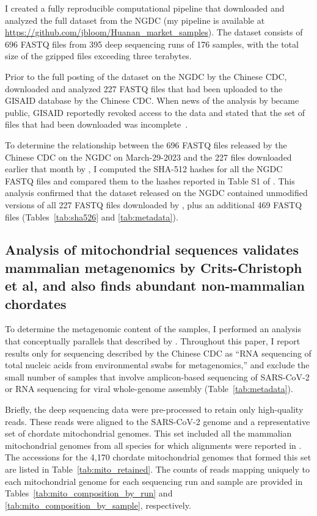 \documentclass[9pt,twocolumn,twoside]{gsajnl_modified}
\begin{document}
I created a fully reproducible computational pipeline that downloaded and analyzed the full dataset from the NGDC (my pipeline is available at \url{https://github.com/jbloom/Huanan_market_samples}).
The dataset consists of 696 FASTQ files from 395 deep sequencing runs of 176 samples, with the total size of the gzipped files exceeding three terabytes.

Prior to the full posting of the dataset on the NGDC by the Chinese CDC, \citet{crits2023genetic} downloaded and analyzed 227 FASTQ files that had been uploaded to the GISAID database by the Chinese CDC.
When news of the analysis by \citet{crits2023genetic} became public, GISAID reportedly revoked access to the data and stated that the set of files that had been downloaded was incomplete~\citep{cohen2023new,gisaid_statement}.

To determine the relationship between the 696 FASTQ files released by the Chinese CDC on the NGDC on March-29-2023 and the 227 files downloaded earlier that month by \citet{crits2023genetic}, I computed the SHA-512 hashes for all the NGDC FASTQ files and compared them to the hashes reported in Table S1 of \citet{crits2023genetic}.
This analysis confirmed that the dataset released on the NGDC contained unmodified versions of all 227 FASTQ files downloaded by \citet{crits2023genetic}, plus an additional 469 FASTQ files (Tables~\ref{tab:sha526} and \ref{tab:metadata}).

\subsection{Analysis of mitochondrial sequences validates mammalian metagenomics by Crits-Christoph et al, and also finds abundant non-mammalian chordates}
To determine the metagenomic content of the samples, I performed an analysis that conceptually parallels that described by \citet{crits2023genetic}.
Throughout this paper, I report results only for sequencing described by the Chinese CDC as ``RNA sequencing of total nucleic acids from environmental swabs for metagenomics,'' and exclude the small number of samples that involve amplicon-based sequencing of SARS-CoV-2 or RNA sequencing for viral whole-genome assembly (Table~\ref{tab:metadata}).

Briefly, the deep sequencing data were pre-processed to retain only high-quality reads.
These reads were aligned to the SARS-CoV-2 genome and a representative set of chordate mitochondrial genomes.
This set included all the mammalian mitochondrial genomes from all species for which alignments were reported in \citet{crits2023genetic}.
The accessions for the 4,170 chordate mitochondrial genomes that formed this set are listed in Table~\ref{tab:mito_retained}.
The counts of reads mapping uniquely to each mitochondrial genome for each sequencing run and sample are provided in Tables~\ref{tab:mito_composition_by_run} and \ref{tab:mito_composition_by_sample}, respectively.
\end{document}
